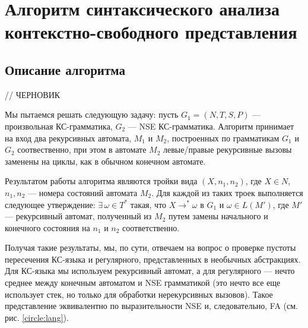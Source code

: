 \section{Алгоритм синтаксического анализа \\ контекстно-свободного представления}

\subsection{Описание алгоритма}

// ЧЕРНОВИК

Мы пытаемся решать следующую задачу: пусть $G_1 = (N, T, S, P)$ --- произвольная КС-грамматика, $G_2$ --- NSE КС-грамматика. Алгоритм принимает на вход два рекурсивных автомата, $M_1$ и $M_2$, построенных по грамматикам $G_1$ и $G_2$ соотвественно, при этом в автомате $M_2$ левые/правые рекурсивные вызовы заменены на циклы, как в обычном конечном автомате.

Результатом работы алгоритма являются тройки вида $(X, n_1, n_2)$, где $X \in N$, $n_1, n_2$ --- номера состояний автомата $M_2$. 
Для каждой из таких троек выполняется следующее утверждение: $\exists \, \omega \in T^*$ такая, что $X \rightarrow^* \omega$ в $G_1$ и $\omega \in L(M')$, где $M'$ --- рекурсивный автомат, полученный из $M_2$ путем замены начального и конечного состояния на $n_1$ и $n_2$ соответственно.

Получая такие результаты, мы, по сути, отвечаем на вопрос о проверке пустоты пересечения КС-языка и регулярного, представленных в необычных абстракциях. 
Для КС-языка мы используем рекурсивный автомат, а для регулярного --- нечто среднее между конечным автоматом и NSE грамматикой (это нечто все еще использует стек, но только для обработки нерекурсивных вызовов). 
Такое представление эквивалентно по выразительности NSE и, следовательно, FA (см. рис. \ref{circle:lang}). 



